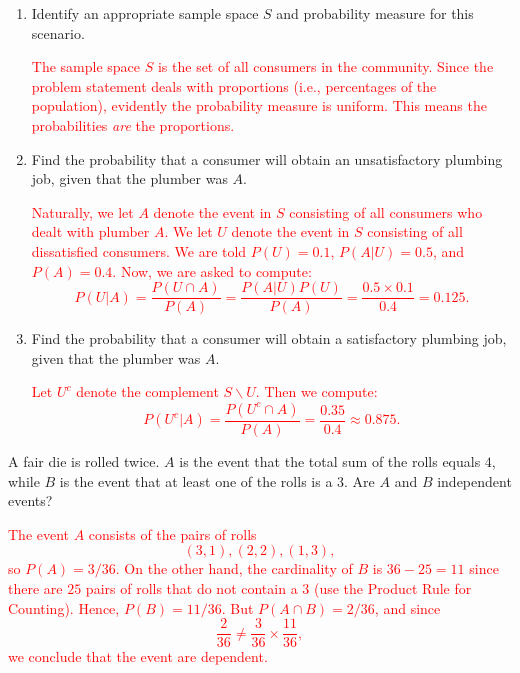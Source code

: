 \documentclass[12pt,reqno]{amsart}
\begin{document}
\medskip
\begin{enumerate}
\item Identify an appropriate sample space $S$ and probability measure for this scenario.
    
\bigskip
\textcolor{red}{The sample space $S$ is the set of all consumers in the community. Since the problem statement deals with proportions (i.e., percentages of the population), evidently the probability measure is uniform. This means the probabilities \textit{are} the proportions.}
\bigskip

\item Find the probability that a consumer will obtain an unsatisfactory plumbing job, given that the plumber was $A$.
    
\bigskip
\textcolor{red}{Naturally, we let $A$ denote the event in $S$ consisting of all consumers who dealt with plumber $A$. We let $U$ denote the event in $S$ consisting of all dissatisfied consumers. We are told $P(U)=0.1$, $P(A| U) = 0.5$, and $P(A)=0.4$. Now, we are asked to compute:
	\[
	P(U|A) = \frac{P(U\cap A)}{P(A)} = \frac{P(A|U)P(U)}{P(A)} = \frac{0.5 \times 0.1}{0.4} = 0.125.
	\]}
\bigskip

\item Find the probability that a consumer will obtain a satisfactory plumbing job, given that the plumber was $A$.
    
\bigskip
\textcolor{red}{Let $U^c$ denote the complement $S\smallsetminus U$. Then we compute:
	\[
	P(U^c | A) = \frac{P(U^c \cap A)}{P(A)} = \frac{0.35}{0.4} \approx 0.875.
	\]}
\end{enumerate}














\bigskip
\prob A fair die is rolled twice. $A$ is the event that the total sum of the rolls equals $4$, while $B$ is the event that at least one of the rolls is a 3. Are $A$ and $B$ independent events?

\bigskip
\textcolor{red}{The event $A$ consists of the pairs of rolls
	\[
	(3,1),(2,2),(1,3),
	\]
so $P(A) = 3/36$. On the other hand, the cardinality of $B$ is $36-25 = 11$ since there are $25$ pairs of rolls that do not contain a $3$ (use the Product Rule for Counting). Hence, $P(B) = 11/36$. But $P(A\cap B) = 2/36$, and since
	\[
	\frac{2}{36} \neq \frac{3}{36} \times \frac{11}{36},
	\]
we conclude that the event are dependent.}
\bigskip
\end{document}
